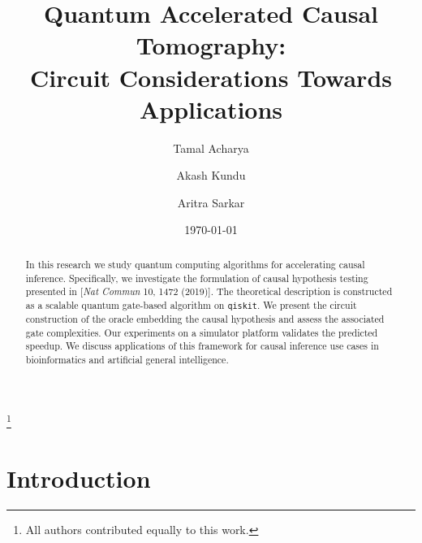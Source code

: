 \documentclass[
 aps,
 jmp,
 amsmath,amssymb,
 reprint,
]{revtex4-2}
\begin{document}

\title[Quantum Accelerated Causal Tomography...]{Quantum Accelerated Causal Tomography: \\Circuit Considerations Towards Applications}%
\thanks{All authors contributed equally to this work.}

\author{Tamal Acharya}
%
\author{Akash Kundu}

%
\author{Aritra Sarkar}
%

\date{\today}

\begin{abstract}
In this research we study quantum computing algorithms for accelerating causal inference.
Specifically, we investigate the formulation of causal hypothesis testing presented in [\textit{Nat Commun} 10, 1472 (2019)].
The theoretical description is constructed as a scalable quantum gate-based algorithm on \texttt{qiskit}.
We present the circuit construction of the oracle embedding the causal hypothesis and assess the associated gate complexities.
Our experiments on a simulator platform validates the predicted speedup.
We discuss applications of this framework for causal inference use cases in bioinformatics and artificial general intelligence.
\end{abstract}

\maketitle

\section{\label{s1}Introduction}
\end{document}
